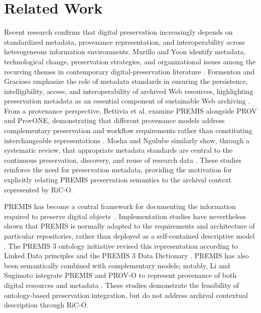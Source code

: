 \documentclass[runningheads]{llncs}
\begin{document}
\section{Related Work}
\label{sec:related-work}


Recent research confirms that digital preservation increasingly depends on standardized metadata, provenance representation, and interoperability across heterogeneous information environments. Murillo and Yoon identify metadata, technological change, preservation strategies, and organizational issues among the recurring themes in contemporary digital-preservation literature \cite{murillo2021study}. Formenton and Gracioso emphasize the role of metadata standards in ensuring the persistence, intelligibility, access, and interoperability of archived Web resources, highlighting preservation metadata as an essential component of sustainable Web archiving \cite{formenton2022metadata}. From a provenance perspective, Bettivia et al. examine PREMIS alongside PROV and ProvONE, demonstrating that different provenance models address complementary preservation and workflow requirements rather than constituting interchangeable representations \cite{bettivia2022intersection}. Mosha and Ngulube similarly show, through a systematic review, that appropriate metadata standards are central to the continuous preservation, discovery, and reuse of research data \cite{mosha2023metadata}.  
These studies reinforce the need for preservation metadata,
providing the motivation for explicitly relating PREMIS preservation semantics to the archival context represented by RiC-O.


PREMIS has become a central framework for documenting the information required to preserve digital objects~\cite{woodyard2007implementing}. Implementation studies have nevertheless shown that PREMIS is normally adapted to the requirements and architecture of particular repositories, rather than deployed as a self-contained descriptive model \cite{donaldson2010implementing}. 
The PREMIS 3 ontology initiative revised this representation according to Linked Data principles and the PREMIS 3 Data Dictionary \cite{di2016premis,caron2018premis}. PREMIS has also been semantically combined with complementary models; notably, Li and Sugimoto integrate PREMIS and PROV-O to represent provenance of both digital resources and metadata \cite{li2014provenance}. These studies demonstrate the feasibility of ontology-based preservation integration, but do not address archival contextual description through RiC-O.
\end{document}
